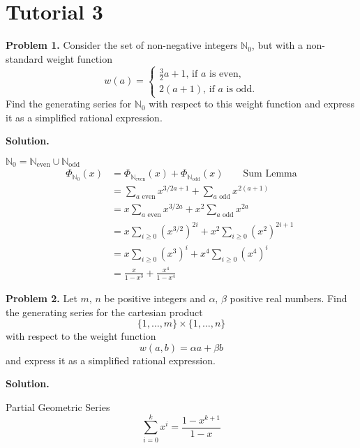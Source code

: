 \section{Tutorial 3}
\textbf{Problem 1.} Consider the set of non-negative integers
$ \mathbb{N}_0 $, but with a non-standard weight function
\[ w(a)=
    \begin{cases}
        \frac{3}{2} a + 1,\,\text{if $a$ is even}, \\
        2(a+1),\,\text{if $a$ is odd.}
    \end{cases} \]
Find the generating series for $ \mathbb{N}_0 $ with respect to this weight
function and express it as a simplified rational expression.

\textbf{Solution.}

$ \mathbb{N}_0=\mathbb{N}_{\text{even}}\cup\mathbb{N}_{\text{odd}} $
\begin{align*}
    \Phi_{\mathbb{N}_0}(x)
     & =\Phi_{\mathbb{N}_{\text{even}}}(x)+\Phi_{\mathbb{N}_{\text{odd}}}(x)\qquad\text{Sum Lemma} \\
     & =\sum\limits_{a \text{ even}}x^{3/2a+1}+\sum\limits_{a \text{ odd}}x^{2(a+1)}               \\
     & =x \sum\limits_{a \text{ even}}x^{3/2a}+x^2\sum\limits_{a \text{ odd}}x^{2a}                \\
     & =x \sum\limits_{i\ge 0} (x^{3/2})^{2i}+x^2\sum\limits_{i \ge 0} (x^{2})^{2i+1}              \\
     & =x \sum\limits_{i\ge 0} (x^3)^i + x^4 \sum\limits_{i\ge 0} (x^4)^i                          \\
     & =\frac{x}{1-x^3} + \frac{x^4}{1-x^4}
\end{align*}

\textbf{Problem 2.} Let $ m,\,n $ be positive integers and $ \alpha,\,\beta $
positive real numbers. Find the generating series for the cartesian product
\[ \{1,\ldots ,m\}\times \{1,\ldots ,n\} \]
with respect to the weight function
\[ w(a,b)=\alpha a+ \beta b \]
and express it as a simplified rational expression.

\textbf{Solution.}


\begin{Theorem}{Partial Geometric Series}{}
    \[ \sum\limits_{i=0}^{k} x^i=\frac{1-x^{k+1}}{1-x} \]
\end{Theorem}


